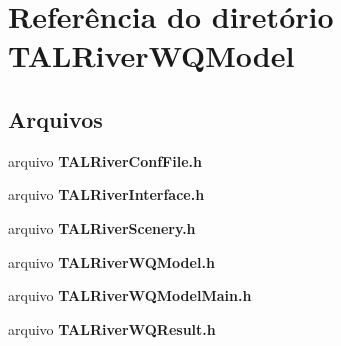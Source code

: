 \section{Referência do diretório T\+A\+L\+River\+W\+Q\+Model}
\label{dir_8e9e7eda37bd6e3ad898a2d74c394def}
\subsection*{Arquivos}
\begin{DoxyCompactItemize}
\item 
arquivo {\bf T\+A\+L\+River\+Conf\+File.\+h}
\item 
arquivo {\bf T\+A\+L\+River\+Interface.\+h}
\item 
arquivo {\bf T\+A\+L\+River\+Scenery.\+h}
\item 
arquivo {\bf T\+A\+L\+River\+W\+Q\+Model.\+h}
\item 
arquivo {\bf T\+A\+L\+River\+W\+Q\+Model\+Main.\+h}
\item 
arquivo {\bf T\+A\+L\+River\+W\+Q\+Result.\+h}
\end{DoxyCompactItemize}

